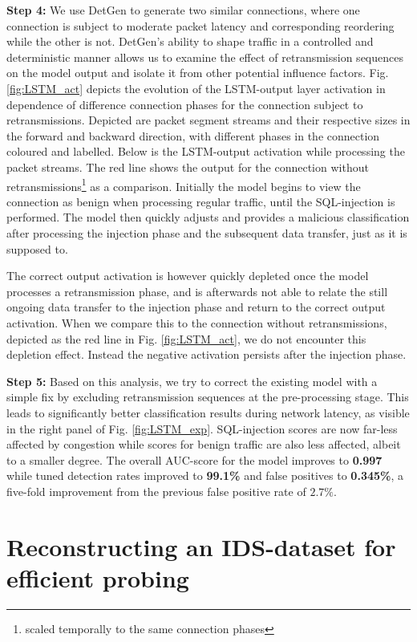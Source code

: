 \documentclass[runningheads]{llncs}
\begin{document}
\textbf{Step 4:} We use DetGen to generate two similar connections, where one connection is subject to moderate packet latency and corresponding reordering while the other is not. DetGen's ability to shape traffic in a controlled and deterministic manner allows us to examine the effect of retransmission sequences on the model output and isolate it from other potential influence factors. 
Fig. \ref{fig:LSTM_act} depicts the evolution of the LSTM-output layer activation in dependence of difference connection phases for the connection subject to retransmissions. Depicted are packet segment streams and their respective sizes in the forward and backward direction, with different phases in the connection coloured and labelled. Below is the LSTM-output activation while processing the packet streams. The red line shows the output for the connection without retransmissions\footnote{scaled temporally to the same connection phases} as a comparison.
Initially the model begins to view the connection as benign when processing regular traffic, until the SQL-injection is performed. The model then quickly adjusts and provides a malicious classification after processing the injection phase and the subsequent data transfer, just as it is supposed to. 

The correct output activation is however quickly depleted once the model processes a retransmission phase, and is afterwards not able to relate the still ongoing data transfer to the injection phase and return to the correct output activation. When we compare this to the connection without retransmissions, depicted as the red line in Fig. \ref{fig:LSTM_act}, we do not encounter this depletion effect. Instead the negative activation persists after the injection phase.

\textbf{Step 5:} Based on this analysis, we try to correct the existing model with a simple fix by excluding retransmission sequences at the pre-processing stage. This leads to significantly better classification results during network latency, as visible in the right panel of Fig. \ref{fig:LSTM_exp}. SQL-injection scores are now far-less affected by congestion while scores for benign traffic are also less affected, albeit to a smaller degree.
The overall AUC-score for the model improves to \textbf{0.997} while tuned detection rates improved to \textbf{99.1\%} and false positives to \textbf{0.345\%}, a five-fold improvement from the previous false positive rate of $2.7\%$. 



\section{Reconstructing an IDS-dataset for efficient probing}\label{Sec:ProbData}
\end{document}
